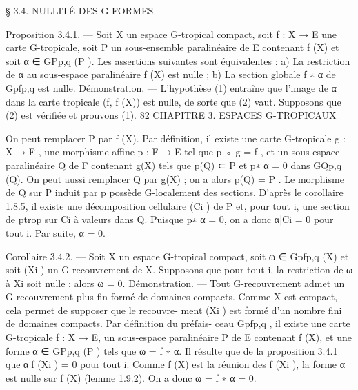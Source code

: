 \documentclass[
  10pt,
]{article}
\newenvironment{Shaded}{}{}
\newcommand{\NormalTok}[1]{#1}
\begin{document}
\begin{Shaded}
\begin{Highlighting}[]
\NormalTok{                          § 3.4. NULLITÉ DES G{-}FORMES}

\NormalTok{Proposition 3.4.1. — Soit X un espace G{-}tropical compact, soit f : X → E une carte}
\NormalTok{G{-}tropicale, soit P un sous{-}ensemble paralinéaire de E contenant f (X) et soit α ∈}
\NormalTok{GPp,q (P ). Les assertions suivantes sont équivalentes :}
\NormalTok{   a) La restriction de α au sous{-}espace paralinéaire f (X) est nulle ;}
\NormalTok{   b) La section globale f ∗ α de Gpfp,q est nulle.}
\NormalTok{Démonstration. — L’hypothèse (1) entraîne que l’image de α dans la carte tropicale}
\NormalTok{(f, f (X)) est nulle, de sorte que (2) vaut. Supposons que (2) est vérifiée et prouvons (1).}
\NormalTok{82                          CHAPITRE 3. ESPACES G{-}TROPICAUX}

\NormalTok{   On peut remplacer P par f (X). Par définition, il existe une carte G{-}tropicale g : X →}
\NormalTok{F , une morphisme affine p : F → E tel que p ◦ g = f , et un sous{-}espace paralinéaire Q}
\NormalTok{de F contenant g(X) tels que p(Q) ⊂ P et p∗ α = 0 dans GQp,q (Q). On peut aussi}
\NormalTok{remplacer Q par g(X) ; on a alors p(Q) = P .}
\NormalTok{   Le morphisme de Q sur P induit par p possède G{-}localement des sections. D’après}
\NormalTok{le corollaire 1.8.5, il existe une décomposition cellulaire (Ci ) de P et, pour tout i, une}
\NormalTok{section de ptrop sur Ci à valeurs dans Q. Puisque p∗ α = 0, on a donc α|Ci = 0 pour}
\NormalTok{tout i. Par suite, α = 0.}

\NormalTok{Corollaire 3.4.2. — Soit X un espace G{-}tropical compact, soit ω ∈ Gpfp,q (X) et soit}
\NormalTok{(Xi ) un G{-}recouvrement de X. Supposons que pour tout i, la restriction de ω à Xi soit}
\NormalTok{nulle ; alors ω = 0.}
\NormalTok{Démonstration. — Tout G{-}recouvrement admet un G{-}recouvrement plus fin formé de}
\NormalTok{domaines compacts. Comme X est compact, cela permet de supposer que le recouvre{-}}
\NormalTok{ment (Xi ) est formé d’un nombre fini de domaines compacts. Par définition du préfais{-}}
\NormalTok{ceau Gpfp,q , il existe une carte G{-}tropicale f : X → E, un sous{-}espace paralinéaire P de E}
\NormalTok{contenant f (X), et une forme α ∈ GPp,q (P ) tels que ω = f ∗ α.}
\NormalTok{   Il résulte que de la proposition 3.4.1 que α|f (Xi ) = 0 pour tout i. Comme f (X) est la}
\NormalTok{réunion des f (Xi ), la forme α est nulle sur f (X) (lemme 1.9.2). On a donc ω = f ∗ α =}
\NormalTok{0.}


\end{Highlighting}
\end{Shaded}
\end{document}
